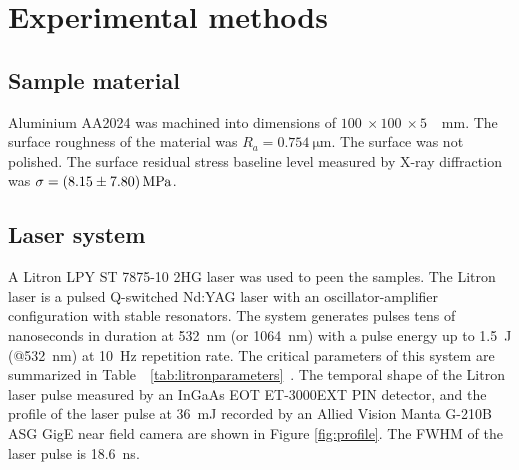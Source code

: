 \section{Experimental methods} \label{sec:develop}
    


\subsection{Sample material}
    Aluminium AA2024 was machined into dimensions of \(\SI[]{100}{} \times \SI[]{100}{} \times \SI[]{5}{}\) \SI[]{}{\mm}. The surface roughness of the material was \( R_a  = \SI[]{0.754}{\micro\metre} \). The surface was not polished.  The surface residual stress baseline level measured by X-ray diffraction was  \( \SI[]{}{\sigma}  = \SI[separate-uncertainty = true]{8.15 \pm 7.80 }{\mega\pascal} \).




\subsection{Laser system}

    A Litron LPY ST 7875-10 2HG laser was used to peen the samples. The Litron laser is a pulsed Q-switched Nd:YAG laser with an oscillator-amplifier configuration with stable resonators. The system generates pulses tens of nanoseconds in duration at \SI{532}{\nano\meter} (or \SI{1064}{\nano\meter}) with a pulse energy up to \SI{1.5}{\joule } (@\SI{532}{\nano\meter}) at \SI{10}{\hertz} repetition rate. The critical parameters of this system are summarized in Table~~\ref{tab:litronparameters}~\cite{litron}. The temporal shape of the Litron laser pulse measured by an InGaAs EOT ET-3000EXT PIN detector, and the profile of the laser pulse at \SI{36}{\milli\joule} recorded by an Allied Vision Manta G-210B ASG GigE near field camera are shown in Figure \ref{fig:profile}. The FWHM of the laser pulse is \SI{18.6}{\ns}.



